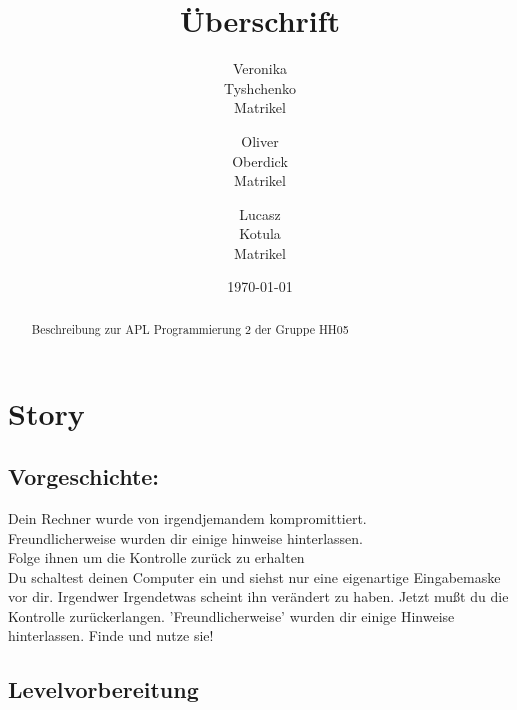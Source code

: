 \documentclass[a4paper 11pt]{article}
\title{\textbf{Überschrift}} %
\author{Veronika\\Tyshchenko\\Matrikel \and Oliver\\Oberdick\\Matrikel \and Lucasz\\Kotula\\Matrikel } %
\date{\today} %
\begin{document}
\maketitle

\begin{abstract}
\begin{center}
Beschreibung zur APL Programmierung 2 der Gruppe HH05
\end{center}
\end{abstract}

\tableofcontents

\thispagestyle{empty}

\newpage
\pagestyle{plain}
\normalsize

\setcounter{page}{1} %

\section{Story}

\subsection{Vorgeschichte:}
Dein Rechner wurde von irgendjemandem kompromittiert. \\
Freundlicherweise wurden dir einige hinweise hinterlassen. \\
Folge ihnen um die Kontrolle zurück zu erhalten \\


Du schaltest deinen Computer ein und siehst nur eine eigenartige Eingabemaske vor dir.
Irgendwer \/ Irgendetwas scheint ihn verändert zu haben.
Jetzt mußt du die Kontrolle zurückerlangen. 'Freundlicherweise' wurden dir einige Hinweise
hinterlassen.
Finde und nutze sie!

\subsection{Levelvorbereitung}
\end{document}
